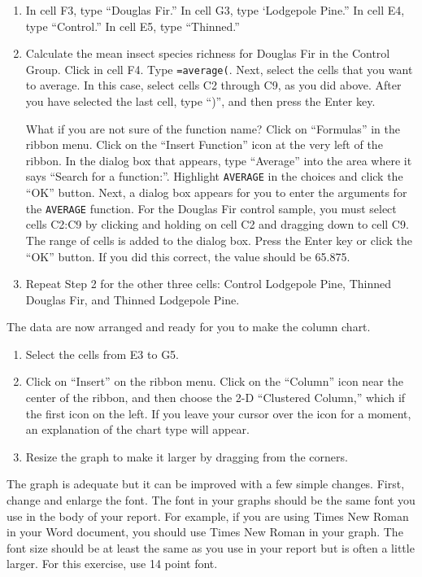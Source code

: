\documentclass[12pt, hidelinks]{exam}
\begin{document}
\begin{enumerate}
	\item In cell F3, type “Douglas Fir.” In cell G3, type ‘Lodgepole Pine.” In cell E4, type “Control.” In cell E5, type “Thinned.” 

	\item Calculate the mean insect species richness for Douglas Fir in the Control Group. Click in cell F4. Type \texttt{=average(}. Next, select the cells that you want to average. In this case, select cells C2 through C9, as you did above. After you have selected the last cell, type “)”, and then press the Enter key. 

What if you are not sure of the function name? Click on “Formulas” in the ribbon menu. Click on the “Insert Function” icon at the very left of the ribbon. In the dialog box that appears, type “Average” into the area where it says “Search for a function:”. Highlight \texttt{AVERAGE} in the choices and click the “OK” button. Next, a dialog box appears for you to enter the arguments for the \texttt{AVERAGE} function. For the Douglas Fir control sample, you must select cells C2:C9 by clicking and holding on cell C2 and dragging down to cell C9. The range of cells is added to the dialog box. Press the Enter key or click the “OK” button. If you did this correct, the value should be 65.875.

	\item Repeat Step 2 for the other three cells: Control Lodgepole Pine, Thinned Douglas Fir, and Thinned Lodgepole Pine. 
\end{enumerate}

The data are now arranged and ready for you to make the column chart.

\begin{enumerate}[resume]
	\item Select the cells from E3 to G5.

	\item Click on “Insert” on the ribbon menu. Click on the “Column” icon near the center of the ribbon, and then choose the 2-D “Clustered Column,” which if the first icon on the left. If you leave your cursor over the icon for a moment, an explanation of the chart type will appear.

	\item Resize the graph to make it larger by dragging from the corners.
\end{enumerate}

The graph is adequate but it can be improved with a few simple changes. First, change and enlarge the font. The font in your graphs should be the same font you use in the body of your report. For example, if you are using Times New Roman in your Word document, you should use Times New Roman in your graph. The font size should be at least the same as you use in your report but is often a little larger. For this exercise, use 14 point font.
\end{document}
